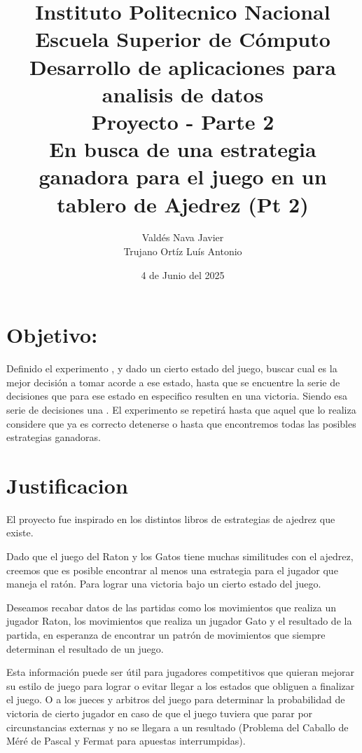 \documentclass[12pt, Tahoma]{article}
\begin{document}
	\title{
		Instituto Politecnico Nacional\\
		Escuela Superior de Cómputo\\
		Desarrollo de aplicaciones para analisis de datos\\
		\vspace{1cm}
			\textbf{Proyecto - Parte 2}\\
			\textbf{En busca de una estrategia ganadora para el juego  en un tablero de Ajedrez (Pt 2)}
	}
	\author{
		Valdés Nava Javier\\
		Trujano Ortíz Luís Antonio
	}
	\date{4 de Junio del 2025}
	\maketitle
	\section*{Objetivo:} Definido el experimento , y dado un cierto estado del juego, buscar cual es la mejor decisión a tomar acorde a ese estado, hasta que se encuentre la serie de decisiones que para ese estado en especifico resulten en una victoria. Siendo esa serie de decisiones una . El experimento se repetirá hasta que aquel que lo realiza considere que ya es correcto detenerse o hasta que encontremos todas las posibles estrategias ganadoras.
	\section*{Justificacion} El proyecto fue inspirado en los distintos libros de estrategias de ajedrez que existe.
	 
	 
	Dado que el juego del Raton y los Gatos tiene muchas similitudes con el ajedrez, creemos que es posible encontrar al menos una estrategia para el jugador que maneja el ratón. Para lograr una victoria bajo un cierto estado del juego.
	
	
	Deseamos recabar datos de las partidas como los movimientos que realiza un jugador Raton, los movimientos que realiza un jugador Gato y el resultado de la partida, en esperanza de encontrar un patrón de movimientos que siempre determinan el resultado de un juego.
	
	
	Esta información puede ser útil para jugadores competitivos que quieran mejorar su estilo de juego para lograr o evitar llegar a los estados que obliguen a finalizar el juego. O a los jueces y arbitros del juego para determinar la probabilidad de victoria de cierto jugador en caso de que el juego tuviera que parar por circunstancias externas y no se llegara a un resultado (Problema del Caballo de Méré de Pascal y Fermat para apuestas interrumpidas).
	 
\end{document}
